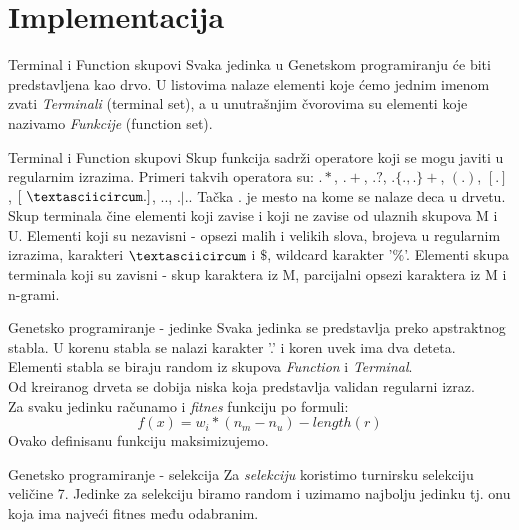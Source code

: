 \section{Implementacija}
    
    \frame{\sectionpage}
    
    \begin{frame}{Terminal i Function skupovi}
        Svaka jedinka u Genetskom programiranju će biti predstavljena kao drvo. U listovima
        nalaze elementi koje ćemo jednim imenom zvati \textit{Terminali} (terminal set), a u unutrašnjim čvorovima su elementi koje nazivamo \textit{Funkcije} (function set).
    \end{frame}
    
    \begin{frame}{Terminal i Function skupovi}
        Skup funkcija sadrži operatore koji se mogu javiti u regularnim izrazima. Primeri takvih operatora su: $.*$, $.+$, $.?$, $.\{.,.\}+$, $(.)$, $[.]$, $[\ \textasciicircum .]$, $..$, $.|.$. Tačka . je mesto na kome se nalaze deca u drvetu. \\
        Skup terminala čine elementi koji zavise i koji ne zavise od ulaznih skupova M i U. Elementi
        koji su nezavisni - opsezi malih i velikih slova, brojeva u regularnim izrazima, karakteri $\textasciicircum$ i $\$$, wildcard karakter '$\%$'. Elementi skupa terminala koji su zavisni - skup karaktera iz M,
        parcijalni opsezi karaktera iz M i n-grami.
    \end{frame}
    
    \begin{frame}{Genetsko programiranje - jedinke}
        Svaka jedinka se predstavlja preko apstraktnog stabla. U korenu stabla se nalazi karakter ’.’ i koren uvek ima dva deteta. Elementi stabla se biraju random iz  skupova \textit{Function} i \textit{Terminal}. \\
        Od kreiranog drveta se dobija niska koja predstavlja validan regularni izraz. \\
        Za svaku jedinku računamo i \textit{fitnes} funkciju po formuli:
        $$f(x) = w_i * (n_m - n_u) - length(r)$$
        Ovako definisanu funkciju maksimizujemo.
    \end{frame}
    
    \begin{frame}{Genetsko programiranje - selekcija}
        Za \textit{selekciju} koristimo turnirsku selekciju veličine 7. Jedinke za selekciju biramo random i uzimamo najbolju jedinku tj. onu koja ima najveći fitnes među odabranim.
    \end{frame}
    
